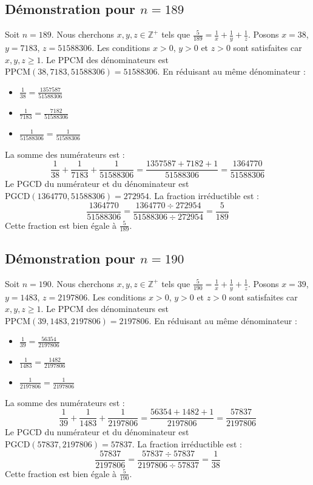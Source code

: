 \documentclass[11pt,a4paper]{article}
\begin{document}
\subsection{Démonstration pour $n = 189$}
Soit $n = 189$. Nous cherchons $x, y, z \in \mathbb{Z}^{+}$ tels que $\frac{5}{189} = \frac{1}{x} + \frac{1}{y} + \frac{1}{z}$.
Posons $x = 38$, $y = 7183$, $z = 51588306$.
Les conditions $x > 0$, $y > 0$ et $z > 0$ sont satisfaites car $x, y, z \geq 1$.
Le PPCM des dénominateurs est $\text{PPCM}(38, 7183, 51588306) = 51588306$.
En réduisant au même dénominateur :
\begin{itemize}
    \item $\frac{1}{38} = \frac{1357587}{51588306}$
    \item $\frac{1}{7183} = \frac{7182}{51588306}$
    \item $\frac{1}{51588306} = \frac{1}{51588306}$
\end{itemize}
La somme des numérateurs est :
$$ \frac{1}{38} + \frac{1}{7183} + \frac{1}{51588306} = \frac{1357587 + 7182 + 1}{51588306} = \frac{1364770}{51588306} $$
Le PGCD du numérateur et du dénominateur est $\text{PGCD}(1364770, 51588306) = 272954$.
La fraction irréductible est :
$$ \frac{1364770}{51588306} = \frac{1364770 \div 272954}{51588306 \div 272954} = \frac{5}{189} $$
Cette fraction est bien égale à $\frac{5}{189}$.

\subsection{Démonstration pour $n = 190$}
Soit $n = 190$. Nous cherchons $x, y, z \in \mathbb{Z}^{+}$ tels que $\frac{5}{190} = \frac{1}{x} + \frac{1}{y} + \frac{1}{z}$.
Posons $x = 39$, $y = 1483$, $z = 2197806$.
Les conditions $x > 0$, $y > 0$ et $z > 0$ sont satisfaites car $x, y, z \geq 1$.
Le PPCM des dénominateurs est $\text{PPCM}(39, 1483, 2197806) = 2197806$.
En réduisant au même dénominateur :
\begin{itemize}
    \item $\frac{1}{39} = \frac{56354}{2197806}$
    \item $\frac{1}{1483} = \frac{1482}{2197806}$
    \item $\frac{1}{2197806} = \frac{1}{2197806}$
\end{itemize}
La somme des numérateurs est :
$$ \frac{1}{39} + \frac{1}{1483} + \frac{1}{2197806} = \frac{56354 + 1482 + 1}{2197806} = \frac{57837}{2197806} $$
Le PGCD du numérateur et du dénominateur est $\text{PGCD}(57837, 2197806) = 57837$.
La fraction irréductible est :
$$ \frac{57837}{2197806} = \frac{57837 \div 57837}{2197806 \div 57837} = \frac{1}{38} $$
Cette fraction est bien égale à $\frac{5}{190}$.
\end{document}
